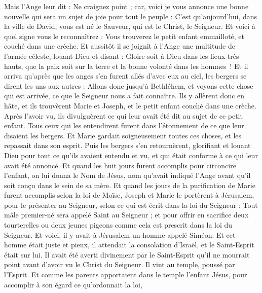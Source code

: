 \begin{multicols}{2}
Mais l'Ange leur dit : Ne craignez point ; car, voici je vous annonce une bonne nouvelle qui sera un sujet de joie pour tout le peuple :
C'est qu'aujourd'hui, dans la ville de David, vous est né le Sauveur, qui est le Christ, le Seigneur.
Et voici à quel signe vous le reconnaîtrez : Vous trouverez le petit enfant emmailloté, et couché dans une crèche.
Et aussitôt il se joignit à l'Ange une multitude de l'armée céleste, louant Dieu et disant :
Gloire soit à Dieu dans les lieux très-hauts, que la paix soit sur la terre et la bonne volonté dans les hommes !
Et il arriva qu'après que les anges s’en furent allés d’avec eux au ciel, les bergers se dirent les uns aux autres : Allons donc jusqu'à Bethléhem, et voyons cette chose qui est arrivée, ce que le Seigneur nous a fait connaître.
Ils y allèrent donc en hâte, et ils trouvèrent Marie et Joseph, et le petit enfant couché dans une crèche.
Après l'avoir vu, ils divulguèrent ce qui leur avait été dit au sujet de ce petit enfant.
Tous ceux qui les entendirent furent dans l'étonnement de ce que leur disaient les bergers.
Et Marie gardait soigneusement toutes ces choses, et les repassait dans son esprit.
Puis les bergers s'en retournèrent, glorifiant et louant Dieu pour tout ce qu'ils avaient entendu et vu, et qui était conforme à ce qui leur avait été annoncé.
Et quand les huit jours furent accomplis pour circoncire l’enfant, on lui donna le Nom de Jésus, nom qu'avait indiqué l'Ange avant qu'il soit conçu dans le sein de sa mère.
Et quand les jours de la purification de Marie furent accomplis selon la loi de Moïse, Joseph et Marie le portèrent à Jérusalem, pour le présenter au Seigneur,
selon ce qui est écrit dans la loi du Seigneur : Tout mâle premier-né sera appelé Saint au Seigneur ;
et pour offrir en sacrifice deux tourterelles ou deux jeunes pigeons comme cela est prescrit dans la loi du Seigneur.
Et voici, il y avait à Jérusalem un homme appelé Siméon. Et cet homme était juste et pieux, il attendait la consolation d'Israël, et le Saint-Esprit était sur lui.
Il avait été averti divinement par le Saint-Esprit qu'il ne mourrait point avant d'avoir vu le Christ du Seigneur.
Il vint au temple, poussé par l'Esprit. Et comme les parents apportaient dans le temple l'enfant Jésus, pour accomplir à son égard ce qu'ordonnait la loi,

\end{multicols}
